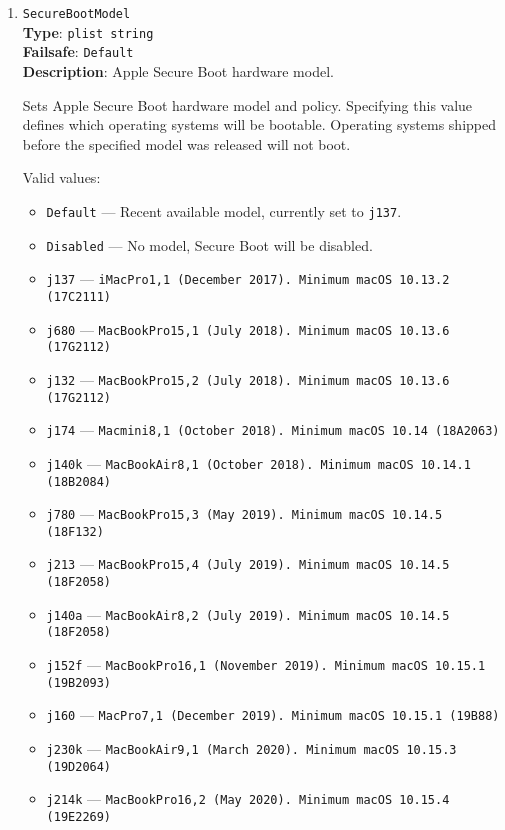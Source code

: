 \documentclass[]{article}
\providecommand{\tightlist}{%
  \setlength{\itemsep}{0pt}\setlength{\parskip}{0pt}}
\begin{document}
\begin{enumerate}
\item \label{secureapplesb}
  \texttt{SecureBootModel}\\
  \textbf{Type}: \texttt{plist\ string}\\
  \textbf{Failsafe}: \texttt{Default}\\
  \textbf{Description}: Apple Secure Boot hardware model.

  Sets Apple Secure Boot hardware model and policy. Specifying
  this value defines which operating systems will be bootable.
  Operating systems shipped before the specified model was released
  will not boot.

  Valid values:

  \begin{itemize}
  \tightlist
  \item \texttt{Default} --- Recent available model, currently set to \texttt{j137}.
  \item \texttt{Disabled} --- No model, Secure Boot will be disabled.
  \item \texttt{j137} --- \texttt{iMacPro1,1 (December 2017). Minimum macOS 10.13.2 (17C2111)}
  \item \texttt{j680} --- \texttt{MacBookPro15,1 (July 2018). Minimum macOS 10.13.6 (17G2112)}
  \item \texttt{j132} --- \texttt{MacBookPro15,2 (July 2018). Minimum macOS 10.13.6 (17G2112)}
  \item \texttt{j174} --- \texttt{Macmini8,1 (October 2018). Minimum macOS 10.14 (18A2063)}
  \item \texttt{j140k} --- \texttt{MacBookAir8,1 (October 2018). Minimum macOS 10.14.1 (18B2084)}
  \item \texttt{j780} --- \texttt{MacBookPro15,3 (May 2019). Minimum macOS 10.14.5 (18F132)}
  \item \texttt{j213} --- \texttt{MacBookPro15,4 (July 2019). Minimum macOS 10.14.5 (18F2058)}
  \item \texttt{j140a} --- \texttt{MacBookAir8,2 (July 2019). Minimum macOS 10.14.5 (18F2058)}
  \item \texttt{j152f} --- \texttt{MacBookPro16,1 (November 2019). Minimum macOS 10.15.1 (19B2093)}
  \item \texttt{j160} --- \texttt{MacPro7,1 (December 2019). Minimum macOS 10.15.1 (19B88)}
  \item \texttt{j230k} --- \texttt{MacBookAir9,1 (March 2020). Minimum macOS 10.15.3 (19D2064)}
  \item \texttt{j214k} --- \texttt{MacBookPro16,2 (May 2020). Minimum macOS 10.15.4 (19E2269)}

\end{itemize}
\end{enumerate}
\end{document}
